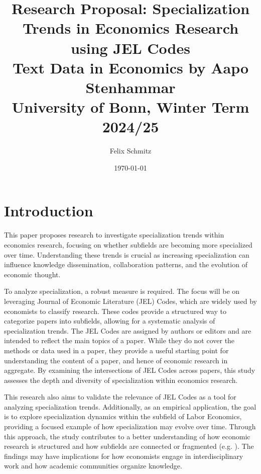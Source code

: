 \documentclass[11pt, a4paper, leqno]{article}
\begin{document}
\title{Research Proposal: Specialization Trends in Economics Research using JEL Codes \\
Text Data in Economics by Aapo Stenhammar \\
University of Bonn, Winter Term 2024/25}

\author{Felix Schmitz\footnotemark[1]}

\date{
    \today
}

\maketitle
{}

\section{Introduction}
This paper proposes research to investigate specialization trends within economics research, focusing on whether subfields are becoming more specialized over time.
Understanding these trends is crucial as increasing specialization can influence knowledge dissemination, collaboration patterns, and the evolution of economic thought.

To analyze specialization, a robust measure is required.
The focus will be on leveraging Journal of Economic Literature (JEL) Codes, which are widely used by economists to classify research.
These codes provide a structured way to categorize papers into subfields, allowing for a systematic analysis of specialization trends.
The JEL Codes are assigned by authors or editors and are intended to reflect the main topics of a paper.
While they do not cover the methods or data used in a paper, they provide a useful starting point for understanding the content of a paper, and hence of economic research in aggregate.
By examining the intersections of JEL Codes across papers, this study assesses the depth and diversity of specialization within economics research.

This research also aims to validate the relevance of JEL Codes as a tool for analyzing specialization trends.
Additionally, as an empirical application, the goal is to explore specialization dynamics within the subfield of Labor Economics, providing a focused example of how specialization may evolve over time.
Through this approach, the study contributes to a better understanding of how economic research is structured and how subfields are connected or fragmented (e.g. \citep{davis2019}).
The findings may have implications for how economists engage in interdisciplinary work and how academic communities organize knowledge.
\end{document}
